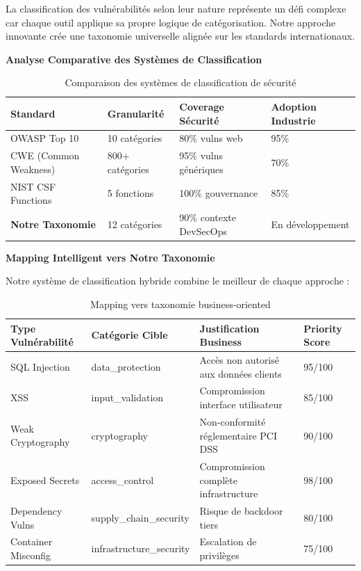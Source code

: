 \documentclass[12pt,a4paper]{report}
\begin{document}
La classification des vulnérabilités selon leur nature représente un défi complexe car chaque outil applique sa propre logique de catégorisation. Notre approche innovante crée une taxonomie universelle alignée sur les standards internationaux.

\textbf{Analyse Comparative des Systèmes de Classification}

\begin{table}[H]
    \centering
    \begin{tabularx}{\textwidth}{|X|X|X|X|}
        \hline
        \textbf{Standard} & \textbf{Granularité} & \textbf{Coverage Sécurité} & \textbf{Adoption Industrie} \\
        \hline
        OWASP Top 10 & 10 catégories & 80\% vulns web & 95\% \\
        \hline
        CWE (Common Weakness) & 800+ catégories & 95\% vulns génériques & 70\% \\
        \hline
        NIST CSF Functions & 5 fonctions & 100\% gouvernance & 85\% \\
        \hline
        \textbf{Notre Taxonomie} & 12 catégories & 90\% contexte DevSecOps & En développement \\
        \hline
    \end{tabularx}
    \caption{Comparaison des systèmes de classification de sécurité}
\end{table}

\textbf{Mapping Intelligent vers Notre Taxonomie}

Notre système de classification hybride combine le meilleur de chaque approche :

\begin{table}[H]
    \centering
    \begin{tabularx}{\textwidth}{|X|X|X|X|}
        \hline
        \textbf{Type Vulnérabilité} & \textbf{Catégorie Cible} & \textbf{Justification Business} & \textbf{Priority Score} \\
        \hline
        SQL Injection & data\_protection & Accès non autorisé aux données clients & 95/100 \\
        \hline
        XSS & input\_validation & Compromission interface utilisateur & 85/100 \\
        \hline
        Weak Cryptography & cryptography & Non-conformité réglementaire PCI DSS & 90/100 \\
        \hline
        Exposed Secrets & access\_control & Compromission complète infrastructure & 98/100 \\
        \hline
        Dependency Vulns & supply\_chain\_security & Risque de backdoor tiers & 80/100 \\
        \hline
        Container Misconfig & infrastructure\_security & Escalation de privilèges & 75/100 \\
        \hline
    \end{tabularx}
    \caption{Mapping vers taxonomie business-oriented}
\end{table}
\end{document}

